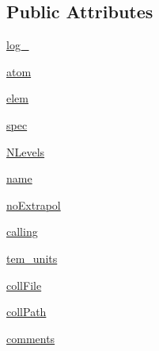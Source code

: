 \subsection*{Public Attributes}
\begin{DoxyCompactItemize}
\item 
\hyperlink{classpyneb_1_1core_1_1pynebcore_1_1___coll_data_ascii_afd87151907f32bc0dc45f0171b61374e}{log\-\_\-}
\item 
\hyperlink{classpyneb_1_1core_1_1pynebcore_1_1___coll_data_ascii_a0c5c7091b1d8a95d9bee2744d713f5c9}{atom}
\item 
\hyperlink{classpyneb_1_1core_1_1pynebcore_1_1___coll_data_ascii_a62e73dc66c7aff7941c5ce94e808c23a}{elem}
\item 
\hyperlink{classpyneb_1_1core_1_1pynebcore_1_1___coll_data_ascii_adaf1b66faf18504ec4b5c8c0b7f6763b}{spec}
\item 
\hyperlink{classpyneb_1_1core_1_1pynebcore_1_1___coll_data_ascii_a4d45fe163c2108853ab418386bf4da56}{N\-Levels}
\item 
\hyperlink{classpyneb_1_1core_1_1pynebcore_1_1___coll_data_ascii_ab74e6bf80237ddc4109968cedc58c151}{name}
\item 
\hyperlink{classpyneb_1_1core_1_1pynebcore_1_1___coll_data_ascii_a52e264b8c50ff2cf7d96c19e3f1e2a95}{no\-Extrapol}
\item 
\hyperlink{classpyneb_1_1core_1_1pynebcore_1_1___coll_data_ascii_ab25fa7ebe84b603684dee62410c1e34c}{calling}
\item 
\hyperlink{classpyneb_1_1core_1_1pynebcore_1_1___coll_data_ascii_a538e48ab1f2ca63dbe55abea69ca2242}{tem\-\_\-units}
\item 
\hyperlink{classpyneb_1_1core_1_1pynebcore_1_1___coll_data_ascii_ab1799c18dddda68ec8651caf93c90e40}{coll\-File}
\item 
\hyperlink{classpyneb_1_1core_1_1pynebcore_1_1___coll_data_ascii_adde256ff299a719e21c78ff9aad1b68c}{coll\-Path}
\item 
\hyperlink{classpyneb_1_1core_1_1pynebcore_1_1___coll_data_ascii_a64b8b36116751d566275b722e40bb3a7}{comments}
\end{DoxyCompactItemize}


